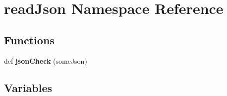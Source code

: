 \hypertarget{namespaceread_json}{}\section{read\+Json Namespace Reference}
\label{namespaceread_json}
\subsection*{Functions}
\begin{DoxyCompactItemize}
\item 
\mbox{\label{namespaceread_json_a4278733b1dc691e64ccfe3dd769f8952}} 
def {\bfseries json\+Check} (some\+Json)
\end{DoxyCompactItemize}
\subsection*{Variables}
